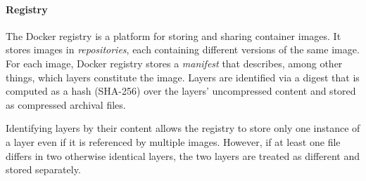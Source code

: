 

\paragraph{Registry}
%
The Docker registry is a platform for storing and sharing container images.
%
It stores images in \emph{repositories}, each containing different versions of
the same image. 
%
For each image, Docker registry stores a \emph{manifest} that describes,
among other things, which layers constitute the image.
%
%
Layers are identified via a digest that is computed as a hash (SHA-256)
over the layers' uncompressed content and stored as compressed archival files.
%
%
%
%
%

%
Identifying layers by their content allows the registry to store only one instance
of a layer even if it is referenced by multiple images.
%
%
However, if at least one file differs in two otherwise identical layers,
the two layers are treated as different and stored separately.
